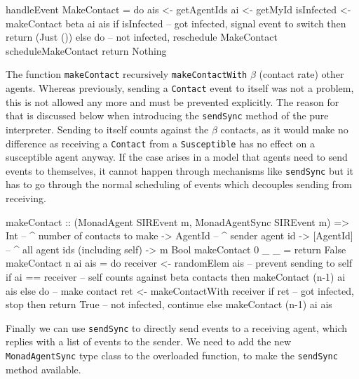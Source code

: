 \begin{HaskellCode}
handleEvent MakeContact = do
  ais        <- getAgentIds
  ai         <- getMyId
  isInfected <- makeContact beta ai ais
  if isInfected
    -- got infected, signal event to switch
    then return (Just ())
    else do
      -- not infected, reschedule MakeContact
      scheduleMakeContact
      return Nothing
\end{HaskellCode}

The function \texttt{makeContact} recursively \texttt{makeContactWith} $\beta$ (contact rate) other agents. Whereas previously, sending a \texttt{Contact} event to itself was not a problem, this is not allowed any more and must be prevented explicitly. The reason for that is discussed below when introducing the \texttt{sendSync} method of the pure interpreter. Sending to itself counts against the $\beta$ contacts, as it would make no difference as receiving a \texttt{Contact} from a \texttt{Susceptible} has no effect on a susceptible agent anyway. If the case arises in a model that agents need to send events to themselves, it cannot happen through mechanisms like \texttt{sendSync} but it has to go through the normal scheduling of events which decouples sending from receiving.

\begin{HaskellCode}
makeContact :: (MonadAgent SIREvent m, MonadAgentSync SIREvent m)
            => Int       -- ^ number of contacts to make
            -> AgentId   -- ^ sender agent id
            -> [AgentId] -- ^ all agent ids (including self)
            -> m Bool
makeContact 0 _ _ = return False
makeContact n ai ais = do
  receiver <- randomElem ais
  -- prevent sending to self
  if ai == receiver
    -- self counts against beta contacts
    then makeContact (n-1) ai ais
    else do
      -- make contact
      ret <- makeContactWith receiver
      if ret
        -- got infected, stop
        then return True
        -- not infected, continue
        else makeContact (n-1) ai ais
\end{HaskellCode}

Finally we can use \texttt{sendSync} to directly send events to a receiving agent, which replies with a list of events to the sender. We need to add the new \texttt{MonadAgentSync} type class to the overloaded function, to make the \texttt{sendSync} method available.

